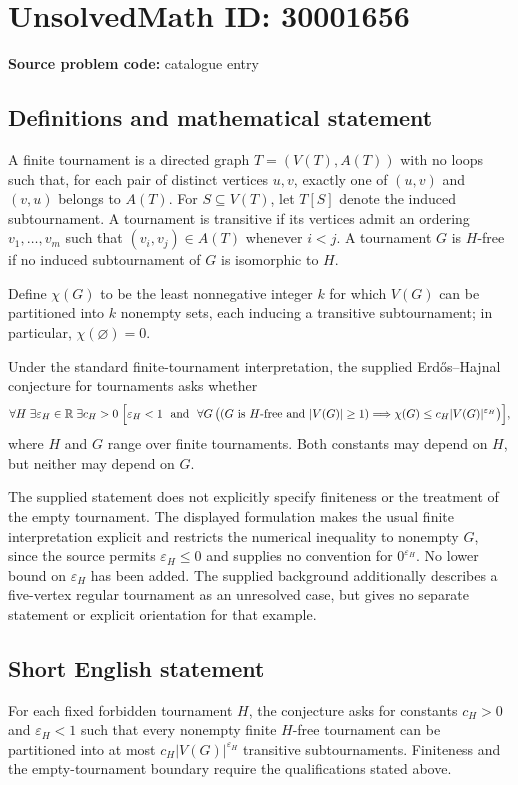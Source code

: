 \documentclass[11pt]{article}
\newcommand{\R}{\mathbb{R}}
\begin{document}
\section*{UnsolvedMath ID: 30001656}
\textbf{Source problem code:} catalogue entry
\subsection{Definitions and mathematical statement}
A finite tournament is a directed graph \(T=(V(T),A(T))\) with no loops such that, for each pair of distinct vertices \(u,v\), exactly one of \((u,v)\) and \((v,u)\) belongs to \(A(T)\). For \(S\subseteq V(T)\), let \(T[S]\) denote the induced subtournament. A tournament is transitive if its vertices admit an ordering \(v_1,\ldots,v_m\) such that \((v_i,v_j)\in A(T)\) whenever \(i<j\). A tournament \(G\) is \(H\)-free if no induced subtournament of \(G\) is isomorphic to \(H\).

Define \(\chi(G)\) to be the least nonnegative integer \(k\) for which \(V(G)\) can be partitioned into \(k\) nonempty sets, each inducing a transitive subtournament; in particular, \(\chi(\varnothing)=0\).

Under the standard finite-tournament interpretation, the supplied Erdős--Hajnal conjecture for tournaments asks whether
\[
\forall H\;\exists\varepsilon_H\in\R\;\exists c_H>0\;\Bigl[\varepsilon_H<1\ \text{ and }\ \forall G\,\bigl((G\text{ is }H\text{-free and }|V(G)|\geq1)\Longrightarrow\chi(G)\leq c_H|V(G)|^{\varepsilon_H}\bigr)\Bigr],
\]
where \(H\) and \(G\) range over finite tournaments. Both constants may depend on \(H\), but neither may depend on \(G\).

The supplied statement does not explicitly specify finiteness or the treatment of the empty tournament. The displayed formulation makes the usual finite interpretation explicit and restricts the numerical inequality to nonempty \(G\), since the source permits \(\varepsilon_H\leq0\) and supplies no convention for \(0^{\varepsilon_H}\). No lower bound on \(\varepsilon_H\) has been added. The supplied background additionally describes a five-vertex regular tournament as an unresolved case, but gives no separate statement or explicit orientation for that example.
\subsection{Short English statement}
For each fixed forbidden tournament \(H\), the conjecture asks for constants \(c_H>0\) and \(\varepsilon_H<1\) such that every nonempty finite \(H\)-free tournament can be partitioned into at most \(c_H|V(G)|^{\varepsilon_H}\) transitive subtournaments. Finiteness and the empty-tournament boundary require the qualifications stated above.
\end{document}
